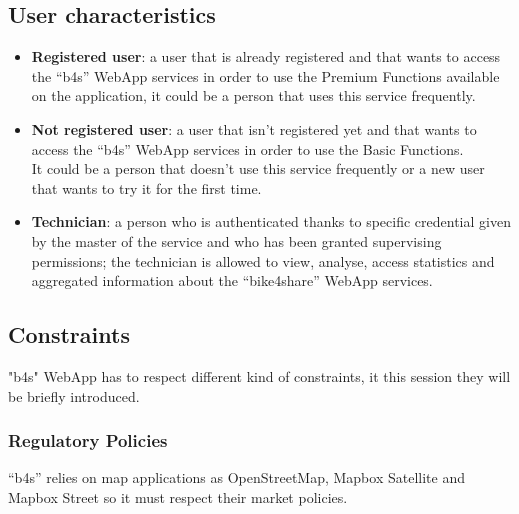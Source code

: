 \documentclass{article}
\begin{document}
\subsection{User characteristics}
\begin{itemize}
    \item \textbf{Registered user}: a user that is already registered and that wants to access the “b4s” WebApp services in order to use the Premium Functions available on the application, it could be a person that uses this service frequently. 
    \item \textbf{Not registered user}: a user that isn’t registered yet and that wants to access the “b4s” WebApp  services in order to use the Basic Functions.\\ It could be a person that  doesn’t use this service frequently or a new user that wants to try it for the first time.
    \item \textbf{Technician}: a person who is authenticated thanks to specific credential given by the master of the service and  who has been granted supervising permissions; the technician is allowed to view, analyse, access statistics and aggregated information about the “bike4share” WebApp services.
\end{itemize}

\subsection{Constraints}
"b4s" WebApp has to respect different kind of constraints, it this session they will be briefly introduced.
\subsubsection{Regulatory Policies}
“b4s” relies on map applications as OpenStreetMap, Mapbox Satellite and Mapbox Street so it must respect their market policies.
\end{document}
